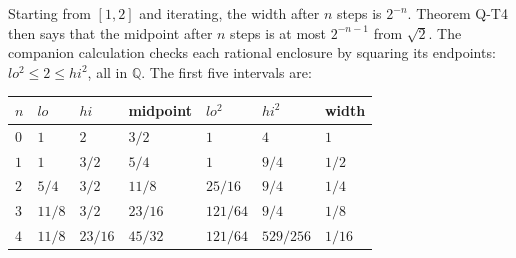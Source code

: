 \documentclass[
  11pt,
]{article}
\begin{document}
Starting from \([1,2]\) and iterating, the width after \(n\) steps is \(2^{-n}\). Theorem Q-T4 then says that the midpoint after \(n\) steps is at most \(2^{-n-1}\) from \(\sqrt{2}\). The companion calculation checks each rational enclosure by squaring its endpoints: \(lo^2\le 2\le hi^2\), all in \(\mathbb{Q}\). The first five intervals are:

\begin{landscape}

\begin{longtable}[]{@{}
  >{\raggedright\arraybackslash}p{}
  >{\raggedright\arraybackslash}p{}
  >{\raggedright\arraybackslash}p{}
  >{\raggedright\arraybackslash}p{}
  >{\raggedright\arraybackslash}p{}
  >{\raggedright\arraybackslash}p{}
  >{\raggedright\arraybackslash}p{}@{}}
\toprule\noalign{}
\begin{minipage}[b]{\linewidth}\raggedright
\(n\)
\end{minipage} & \begin{minipage}[b]{\linewidth}\raggedright
\(lo\)
\end{minipage} & \begin{minipage}[b]{\linewidth}\raggedright
\(hi\)
\end{minipage} & \begin{minipage}[b]{\linewidth}\raggedright
midpoint
\end{minipage} & \begin{minipage}[b]{\linewidth}\raggedright
\(lo^2\)
\end{minipage} & \begin{minipage}[b]{\linewidth}\raggedright
\(hi^2\)
\end{minipage} & \begin{minipage}[b]{\linewidth}\raggedright
width
\end{minipage} \\
\midrule\noalign{}
\endhead
\bottomrule\noalign{}
\endlastfoot
\(0\) & \(1\) & \(2\) & \(3/2\) & \(1\) & \(4\) & \(1\) \\
\(1\) & \(1\) & \(3/2\) & \(5/4\) & \(1\) & \(9/4\) & \(1/2\) \\
\(2\) & \(5/4\) & \(3/2\) & \(11/8\) & \(25/16\) & \(9/4\) & \(1/4\) \\
\(3\) & \(11/8\) & \(3/2\) & \(23/16\) & \(121/64\) & \(9/4\) & \(1/8\) \\
\(4\) & \(11/8\) & \(23/16\) & \(45/32\) & \(121/64\) & \(529/256\) & \(1/16\) \\
\end{longtable}

\end{landscape}
\end{document}
